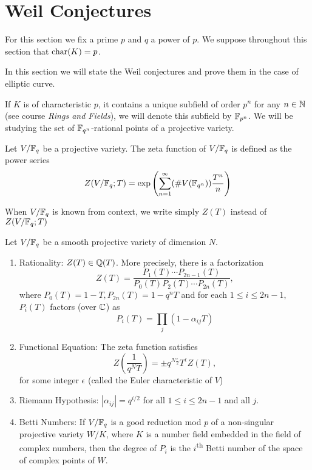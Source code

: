 \section{Weil Conjectures}
\label{sec:finite-fields}

For this section we fix a prime $p$ and $q$ a power of $p$.
We suppose throughout this section that $\operatorname{char}(K) = p$.

In this section we will state the Weil conjectures and prove them in the
case of elliptic curve.

If $K$ is of characteristic $p$,
it contains a unique subfield of order $p^n$ for any $n \in \mathbb{N}$ (see
course \emph{Rings and Fields}), we will denote this subfield by $\mathbb{F}_{p^n}$.
We will be studying the set of
$\mathbb{F}_{q^n}$-rational points of a projective variety.

\begin{definition}
	Let $V/\mathbb{F}_q$ be a projective variety.
	The zeta function of $V/\mathbb{F}_q$ is defined as the power series
	\begin{equation*}
		Z(V/\mathbb{F}_q; T) = \exp\left(\sum_{n=1}^\infty (\#V(\mathbb{F}_{q^n}))
		\frac{T^n}{n}\right)
	\end{equation*}
\end{definition}

\begin{notation}
	When $V/\mathbb{F}_q$ is known from context, we write simply $Z(T)$
	instead of $Z(V/\mathbb{F}_q; T)$
\end{notation}

\begin{theorem}
	\label{thm:weil}
	Let $V/\mathbb{F}_q$ be a smooth projective variety of dimension $N$.
	\begin{enumerate}[label=(\alph*)]
		\item Rationality: $Z(T) \in \mathbb{Q}(T)$. More precisely, 
			there is a factorization
			\begin{equation*}
				Z(T) = \frac{P_1(T)\cdots P_{2n-1}(T)}
				{P_0(T)P_2(T) \cdots P_{2n}(T)},
			\end{equation*}
			where $P_0(T) = 1 - T, P_{2n}(T) = 1 - q^nT$ and for each
			$1 \leq i \leq 2n - 1$, $P_i(T)$ factors (over $\mathbb{C}$) as
			\begin{equation*}
				P_i(T) = \prod_j (1 - \alpha_{ij}T)
			\end{equation*}
		\item Functional Equation: The zeta function satisfies
			\begin{equation*}
				Z\left(\frac{1}{q^NT}\right) = \pm q^{N\frac{\epsilon}{2}}
				T^{\epsilon} Z(T),
			\end{equation*}
			for some integer $\epsilon$ (called the Euler characteristic of $V$)
		\item Riemann Hypothesis: $|\alpha_{ij}| = q^{i/2}$
			for all $1 \leq i \leq 2n - 1$ and all $j$.
		\item Betti Numbers: If $V/\mathbb{F}_q$ is a good reduction mod $p$ of a
			non-singular projective variety $W/K$, where $K$ is a number
			field embedded in the field of complex numbers, then the degree
			of $P_i$ is the $i$\textsuperscript{th} Betti number of the space
			of complex points of $W$. 
	\end{enumerate}
\end{theorem}


